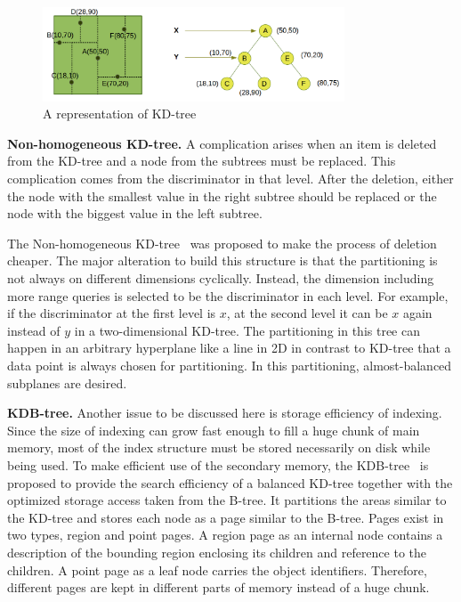 \documentclass[a4paper,12pt]{article}
\begin{document}
\begin{figure}
\centering
\includegraphics[width=0.8\textwidth]{kd-Tree}
\caption{A representation of KD-tree}
\label{figkdtree}
\end{figure}


\textbf{Non-homogeneous KD-tree.}
A complication arises when an item is deleted from the KD-tree and a node from the subtrees must be replaced. This complication comes from the discriminator in that level. After the deletion, either the node with the smallest value in the right subtree should be replaced or the node with the biggest value in the left subtree. 

The Non-homogeneous KD-tree~\cite{nonhomkdtree} was proposed to make the process of deletion cheaper. The major alteration to build this structure is that the partitioning is not always on different dimensions cyclically. Instead, the dimension including more range queries is selected to be the discriminator in each level. For example, if the discriminator at the first level is $x$, at the second level it can be $x$ again instead of $y$ in a two-dimensional KD-tree. 
The partitioning in this tree can happen in an arbitrary hyperplane like a line in 2D in contrast to KD-tree that a data point is always chosen for partitioning. In this partitioning, almost-balanced subplanes are desired.
 
\textbf{KDB-tree.} Another issue to be discussed here is storage efficiency of indexing.
Since the size of indexing can grow fast enough to fill a huge chunk of main memory, most of the index structure must be stored necessarily on disk while being used.
To make efficient use of the secondary memory, the KDB-tree~\cite{kdbtree} is proposed to provide the search efficiency of a balanced KD-tree together with the optimized storage access taken from the B-tree. It partitions the areas similar to the KD-tree and stores each node as a page similar to the B-tree. Pages exist in two types, 
region and point pages. A region page as an internal node contains a description of the bounding region enclosing its children and reference to the children. 
A point page as a leaf node carries the object identifiers. Therefore, different pages are kept in different parts of memory instead of a huge chunk. 
\end{document}
